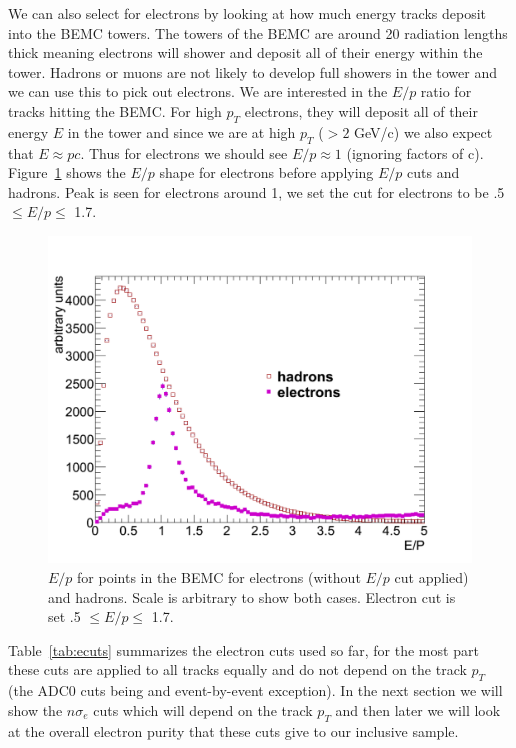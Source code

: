 We can also select for electrons by looking at how much energy tracks deposit into the BEMC towers. The towers of the BEMC are around 20 radiation lengths thick meaning electrons will shower and deposit all of their energy within the tower. Hadrons or muons are not likely to develop full showers in the tower and we can use this to pick out electrons. We are interested in the $E/p$ ratio for tracks hitting the BEMC. For high $p_T$ electrons, they will deposit all of their energy $E$ in the tower and since we are at high $p_T$ ($> 2$ GeV/c) we also expect that $E \approx pc$. Thus for electrons we should see $E/p \approx 1$ (ignoring factors of c). Figure~\ref{fig:EOP} shows the $E/p$ shape for electrons before applying $E/p$ cuts and hadrons. Peak is seen for electrons around 1, we set the cut for electrons to be .5 $\leq E/p \leq$ 1.7.

\begin{figure}[htbp]
\begin{center}
\includegraphics[scale=.65]{Plots/NPE/EOP_plot.pdf}
\end{center}
\caption[$E/p$ in BEMC]{$E/p$ for points in the BEMC for electrons (without $E/p$ cut applied) and hadrons. Scale is arbitrary to show both cases. Electron cut is set .5 $\leq E/p \leq$ 1.7.}
\label{fig:EOP}
\end{figure}

Table~\ref{tab:ecuts} summarizes the electron cuts used so far, for the most part these cuts are applied to all tracks equally and do not depend on the track $p_T$ (the ADC0 cuts being and event-by-event exception). In the next section we will show the $n\sigma_e$ cuts which will depend on the track $p_{T}$ and then later we will look at the overall electron purity that these cuts give to our inclusive sample.

